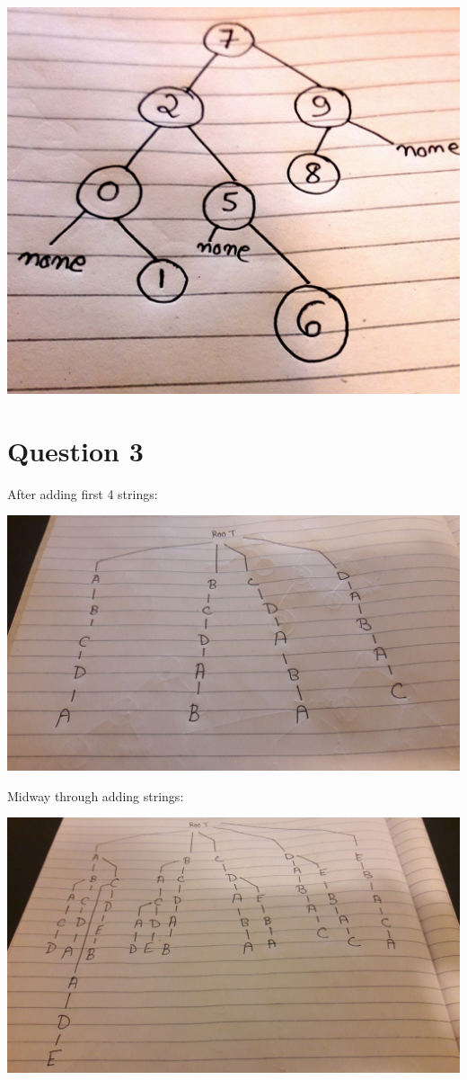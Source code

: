 \documentclass{article}
\begin{document}
\includegraphics[scale=0.1]{15.jpg}



\section*{Question 3}

After adding first 4 strings:

\includegraphics[scale=0.05]{16.jpg}


Midway through adding strings:






\includegraphics[scale=0.1]{17.jpg}
\end{document}
